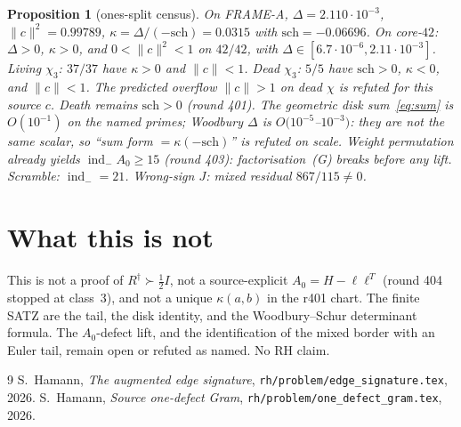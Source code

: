 \documentclass[11pt]{article}
\newtheorem{prop}{Proposition}
\theoremstyle{remark}
\newcommand{\indm}{\operatorname{ind}_{-}}
\newcommand{\half}{\tfrac12}
\begin{document}
\begin{prop}[ones-split census]\label{prop:worlds}
On FRAME-A, $\Delta=2.110\cdot 10^{-3}$,
$\|c\|^2=0.99789$, $\kappa=\Delta/(-\mathrm{sch})=0.0315$
with $\mathrm{sch}=-0.06696$.
On core-$42$: $\Delta>0$, $\kappa>0$, and $0<\|c\|^2<1$ on
$42/42$, with $\Delta\in[6.7\cdot 10^{-6},2.11\cdot 10^{-3}]$.
Living $\chi_3$: $37/37$ have $\kappa>0$ and $\|c\|<1$.
Dead $\chi_3$: $5/5$ have $\mathrm{sch}>0$, $\kappa<0$,
\emph{and} $\|c\|<1$.
The predicted overflow $\|c\|>1$ on dead $\chi$ is refuted
for this source $c$.
Death remains $\mathrm{sch}>0$ (round 401).
The geometric disk sum~\eqref{eq:sum} is $O(10^{-1})$ on
the named primes; Woodbury $\Delta$ is
$O(10^{-5}$--$10^{-3})$: they are not the same scalar, so
``sum form $=\kappa(-\mathrm{sch})$'' is refuted on scale.
Weight permutation already yields $\indm A_0\ge 15$
(round 403): factorisation~(G) breaks before any lift.
Scramble: $\indm=21$.  Wrong-sign $J$: mixed residual
$867/115\neq 0$.
\end{prop}

\section{What this is not}\label{sec:not}

This is not a proof of $R^\dagger\succ\half I$, not a
source-explicit $A_0=H-\ell\ell^T$ (round 404 stopped at
class~3), and not a unique $\kappa(a,b)$ in the r401 chart.
The finite SATZ are the tail, the disk identity, and the
Woodbury--Schur determinant formula.
The $A_0$-defect lift, and the identification of the mixed
border with an Euler tail, remain open or refuted as named.
No RH claim.

\begin{thebibliography}{9}
 S.~Hamann, \emph{The augmented edge signature},
  \texttt{rh/problem/edge\_signature.tex}, 2026.
 S.~Hamann, \emph{Source one-defect Gram},
  \texttt{rh/problem/one\_defect\_gram.tex}, 2026.
\end{thebibliography}
\end{document}
